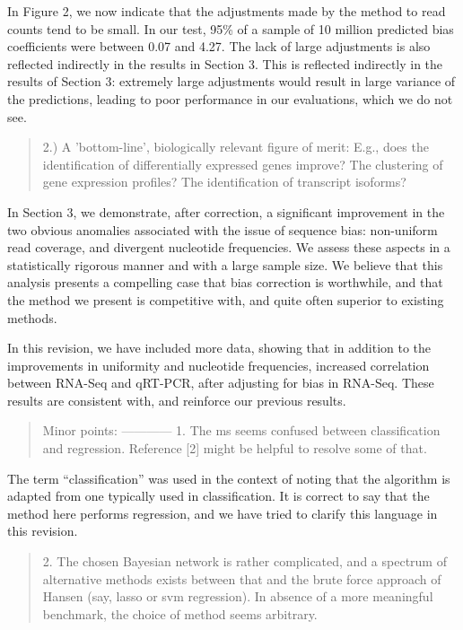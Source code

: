 \documentclass{article}
\begin{document}
In Figure 2, we now indicate that the adjustments made by the method to read
counts tend to be small. In our test, 95\% of a sample of 10 million predicted
bias coefficients were between 0.07 and 4.27. The lack of large adjustments is
also reflected indirectly in the results in Section 3.  This is reflected
indirectly in the results of Section 3: extremely large adjustments would result
in large variance of the predictions, leading to poor performance in our
evaluations, which we do not see.


\begin{quote}
2.) A 'bottom-line', biologically relevant figure of merit: E.g., does
the identification of differentially expressed genes improve? The
clustering of gene expression profiles? The identification of
transcript isoforms?
\end{quote}

In Section 3, we demonstrate, after correction, a significant improvement in
the two obvious anomalies associated with the issue of sequence bias:
non-uniform read coverage, and divergent nucleotide frequencies. We assess these
aspects in a statistically rigorous manner and with a large sample size. We
believe that this analysis presents a compelling case that bias correction is
worthwhile, and that the method we present is competitive with, and quite often
superior to existing methods.

In this revision, we have included more data, showing that in addition to the
improvements in uniformity and nucleotide frequencies, increased correlation
between RNA-Seq and qRT-PCR, after adjusting for bias in RNA-Seq. These results
are consistent with, and reinforce our previous results.


\begin{quote}
Minor points:
------------
1. The ms seems confused between classification and regression.
Reference [2] might be helpful to resolve some of that.
\end{quote}

The term ``classification'' was used in the context of noting that the algorithm
is adapted from one typically used in classification. It is correct to say that
the method here performs regression, and we have tried to clarify this language
in this revision.



\begin{quote}
2. The chosen Bayesian network is rather complicated, and a spectrum
of alternative methods exists between that and the brute force
approach of Hansen (say, lasso or svm regression). In absence of a
more meaningful benchmark, the choice of method seems arbitrary.
\end{quote}
\end{document}
